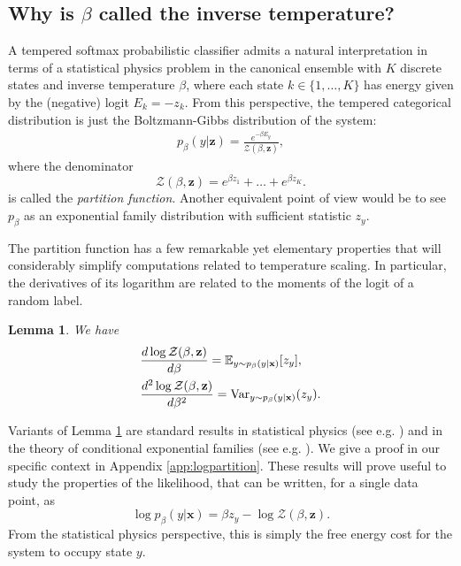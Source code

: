 \documentclass[10pt,dvipsnames]{article}
\newcommand{\bx}{\mathbf{x}}%
\newcommand{\bz}{\mathbf{z}}%
\theoremstyle{plain}
\newtheorem{lemma}{Lemma}
\theoremstyle{definition}
\theoremstyle{remark}
\begin{document}
\subsection{Why is $\beta$ called the inverse temperature?} 
\label{sec:statphys}
A tempered softmax probabilistic classifier admits a natural interpretation in terms of a statistical physics problem in the canonical ensemble with $K$ discrete states and inverse temperature $\beta$, where each state $k\in \{1, \ldots, K \}$ has energy given by the (negative) logit $E_{k}=-z_{k}$. From this perspective, the tempered categorical distribution is just the Boltzmann-Gibbs distribution of the system: 
\begin{align}
    p_{\beta}(y|\bz)=\frac{e^{-\beta E_{y}}}{\mathcal{Z}(\beta, \bz)},
\end{align}
where the denominator
\begin{equation}
    \mathcal{Z}(\beta, \bz) = e^{\beta z_1}+ \ldots + e^{\beta z_K}.
\end{equation}
is called the \emph{partition function}.
Another equivalent point of view would be to see $p_{\beta}$ as an exponential family distribution with sufficient statistic $z_y$.

The partition function has a few remarkable yet elementary properties that will considerably simplify computations related to temperature scaling. In particular, the derivatives of its logarithm are related to the moments of the logit of a random label.

\begin{lemma} We have
\label{prop:logpartition}
   \begin{align}
        &\frac{d \log \mathcal{Z}(\beta, \bz)}{d \beta} =  \mathbb{E}_{y \sim p_\beta(y | \bx)} [ z_y ], \\
        &\frac{d^2 \log \mathcal{Z}(\beta, \bz)}{d \beta^2} =  \textup{Var}_{y \sim p_\beta(y | \bx)} ( z_y ).
    \end{align}
\end{lemma}
Variants of Lemma \ref{prop:logpartition} are standard results in statistical physics (see e.g. \citealp{kardar2007statistical}) and in the theory of conditional exponential families (see e.g. \citealp{domke2020moment}). We give a proof in our specific context in Appendix \ref{app:logpartition}. These results will prove useful to study the properties of the likelihood, that can be written, for a single data point, as
\begin{equation}
    \log p_\beta (y| \bx) = \beta z_{y} - \log \mathcal{Z}(\beta, \bz).
\end{equation}
From the statistical physics perspective, this is simply the free energy cost for the system to occupy state $y$. 
\end{document}
